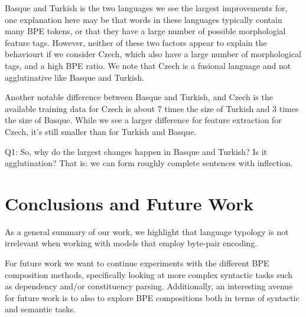 \documentclass[11pt]{article}
\begin{document}
        Basque and Turkish is the two languages we see the largest
     improvements for, one explanation here may be that words in these
     languages typically contain many BPE tokens, or that they have a
     large number of possible morphologial feature tags.  However,
     neither of these two factors appear to explain the behaviourt if
     we consider Czech, which also have a large number of
     morphological tags, and a high BPE ratio. We note that Czech is a
     fusional language and not agglutinative like Basque and Turkish.

            Another notable difference between Basque and Turkish, and
     Czech is the available training data for Czech is about 7 times
     the size of Turkish and 3 times the size of Basque.  While we see
     a larger difference for feature extraction for Czech, it's still
     smaller than for Turkish and Basque.

        Q1: So, why do the largest changes happen in Basque and
     Turkish? Is it agglutination? That is: we can form roughly
     complete sentences with inflection.
    
    
    

    
    \section{Conclusions and Future Work}
        	As a general summary of our work, we highlight that
     language typology is not irrelevant when working with models that
     employ byte-pair encoding.

            For future work we want to continue experiments with the
     different BPE composition methods, specifically looking at more
     complex syntactic tasks such as dependency and/or constituency
     parsing. Additionally, an interesting avenue for future work is
     to also to explore BPE compositions both in terms of syntactic
     and semantic tasks.
    
	
	
	
	
	
\end{document}
